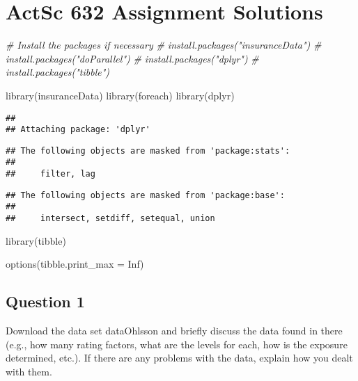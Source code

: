 \documentclass[
]{article}
\author{}
\date{\vspace{-2.5em}}
\newenvironment{Shaded}{\begin{snugshade}}{\end{snugshade}}
\newcommand{\AttributeTok}[1]{\textcolor[rgb]{0.77,0.63,0.00}{#1}}
\newcommand{\CommentTok}[1]{\textcolor[rgb]{0.56,0.35,0.01}{\textit{#1}}}
\newcommand{\ConstantTok}[1]{\textcolor[rgb]{0.00,0.00,0.00}{#1}}
\newcommand{\FunctionTok}[1]{\textcolor[rgb]{0.00,0.00,0.00}{#1}}
\newcommand{\NormalTok}[1]{#1}
\begin{document}
\hypertarget{actsc-632-assignment-solutions}{%
\section{ActSc 632 Assignment
Solutions}\label{actsc-632-assignment-solutions}}

\begin{Shaded}
\begin{Highlighting}[]
\CommentTok{\# Install the packages if necessary}
\CommentTok{\# install.packages("insuranceData")}
\CommentTok{\# install.packages("doParallel")}
\CommentTok{\# install.packages("dplyr")}
\CommentTok{\# install.packages("tibble")}

\FunctionTok{library}\NormalTok{(insuranceData)}
\FunctionTok{library}\NormalTok{(foreach)}
\FunctionTok{library}\NormalTok{(dplyr)}
\end{Highlighting}
\end{Shaded}

\begin{verbatim}
## 
## Attaching package: 'dplyr'
\end{verbatim}

\begin{verbatim}
## The following objects are masked from 'package:stats':
## 
##     filter, lag
\end{verbatim}

\begin{verbatim}
## The following objects are masked from 'package:base':
## 
##     intersect, setdiff, setequal, union
\end{verbatim}

\begin{Shaded}
\begin{Highlighting}[]
\FunctionTok{library}\NormalTok{(tibble)}

\FunctionTok{options}\NormalTok{(}\AttributeTok{tibble.print\_max =} \ConstantTok{Inf}\NormalTok{)}
\end{Highlighting}
\end{Shaded}

\hypertarget{question-1}{%
\subsection{Question 1}\label{question-1}}

Download the data set dataOhlsson and briefly discuss the data found in
there (e.g., how many rating factors, what are the levels for each, how
is the exposure determined, etc.). If there are any problems with the
data, explain how you dealt with them.
\end{document}
